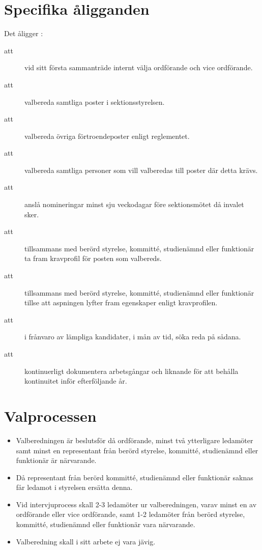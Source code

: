 \documentclass[a4paper]{article}
\begin{document}
\begin{foreningenv}{\forening{}}
    \section{Specifika åligganden}
    Det åligger \forening{}:
    \begin{description} 
        \item[att] vid sitt första sammanträde internt välja ordförande och vice ordförande.
        \item[att] valbereda samtliga poster i sektionsstyrelsen.
        \item[att] valbereda övriga förtroendeposter enligt reglementet.
        \item[att] valbereda samtliga personer som vill valberedas till poster där detta krävs.
        \item[att] anslå nomineringar minst sju veckodagar före sektionsmötet då invalet sker.
        \item[att] tillsammans med berörd styrelse, kommitté, studienämnd eller funktionär ta fram kravprofil för posten som valbereds. 
        \item[att] tillsammans med berörd styrelse, kommitté, studienämnd eller funktionär tillse att aspningen lyfter fram  egenskaper enligt kravprofilen.
        \item[att] i frånvaro av lämpliga kandidater, i mån av tid, söka reda på sådana.
        \item[att] kontinuerligt dokumentera arbetsgångar och liknande för att behålla kontinuitet inför efterföljande år.
    \end{description}
    
    \section{Valprocessen}
    \begin{itemize}
        \item Valberedningen är beslutsför då ordförande, minst två ytterligare ledamöter samt minst en representant från berörd styrelse, kommitté, studienämnd eller funktionär är närvarande.
        \item Då representant från berörd kommitté, studienämnd eller funktionär saknas får ledamot i styrelsen ersätta denna.
        \item Vid intervjuprocess skall 2-3 ledamöter ur valberedningen, varav minst en av ordförande eller vice ordförande, samt 1-2 ledamöter från berörd styrelse, kommitté, studienämnd eller funktionär vara närvarande.
        \item Valberedning skall i sitt arbete ej vara jävig.
    \end{itemize}
    

\end{foreningenv}
\end{document}
